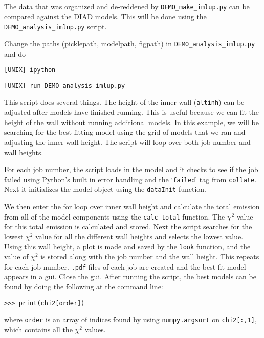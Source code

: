 \documentclass{article}
\begin{document}
The data that was organized and de-reddened by \texttt{DEMO\_make\_imlup.py} can be compared against the DIAD models. This will be done using the \texttt{DEMO\_analysis\_imlup.py} script. 

Change the paths (picklepath, modelpath, figpath) in \texttt{DEMO\_analysis\_imlup.py} and do 

\vspace{2mm}
\texttt{[UNIX] ipython}
\vspace{2mm}

\vspace{2mm}
\texttt{[UNIX] run DEMO\_analysis\_imlup.py}
\vspace{2mm}

This script does several things.  The height of the inner wall (\texttt{altinh}) can be adjusted after models have finished running. This is useful because we can fit the height of the wall without running additional models. 
In this example, we will be searching for the best fitting model using the grid of models that we ran and adjusting the inner wall height. The script will loop over both job number and wall heights.

For each job number, the script loads in the model and it checks to see if the job failed using Python's built in error handling and the `\texttt{failed}' tag from \texttt{collate}. 
Next it initializes the model object using the \texttt{dataInit} function. 

We then enter the for loop over inner wall height and calculate the total emission from all of the model components using the \texttt{calc\_total} function. The $\chi^2$ value for this total emission is calculated and stored. Next the script searches for the lowest $\chi^2$ value for all the different wall heights and selects the lowest value. Using this wall height, a plot is made and saved by the \texttt{look} function, and the value of $\chi^2$ is stored along with the job number and the wall height. This repeats for each job number. \texttt{.pdf} files of each job are created and the best-fit model appears in a gui.  Close the gui. After running the script, the best models can be found by doing the following at the command line:

\vspace{2mm}
\texttt{>>> print(chi2[order])}
\vspace{2mm}

where \texttt{order} is an array of indices found by using \texttt{numpy.argsort} on \texttt{chi2[:,1]}, which contains all the $\chi^2$ values. 
\end{document}
